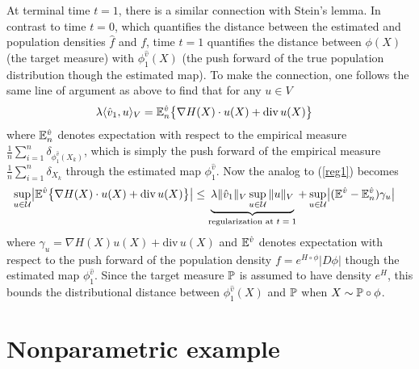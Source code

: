 \documentclass[noinfoline]{imsart}
\begin{document}
 At terminal time $t=1$, there is a similar connection with Stein's lemma. In contrast to time $t=0$, which quantifies the distance between the estimated  and population densities $\hat f$ and $f$,  time $t=1$ quantifies the distance between $\phi(X)$ (the target measure) with $\phi_1^{\hat v}(X)$ (the push forward of the true population distribution though the estimated map).  To make the connection, one follows  the same line of argument as above to  find that  for any $u\in V$
\begin{align}
\lambda \langle \hat v_1, u\rangle_V &=  {\Bbb E}^{\hat v}_n\bigl\{ \nabla H(X)\cdot u(X ) + \text{div}\, u(X)\bigr\} \label{stein}
\end{align}
where ${\Bbb E}^{\hat v}_n$ denotes  expectation with respect to the empirical measure $\frac{1}{n}\sum_{i=1}^n \delta_{\phi^{\hat v}_1(X_k)}$, which is simply the push forward of the empirical measure $\frac{1}{n}\sum_{i=1}^n \delta_{X_k}$ through the estimated map $\phi^{\hat v}_1$.
Now the analog to (\ref{reg1})  becomes
   \begin{align}
   \label{reg2}
    \sup_{u\in \mathcal U} \bigl| {\Bbb E^{\hat v}}\bigl\{ \nabla H(X)\cdot  u(X) + \text{div}\, u(X)\bigr\} \bigr|   &\leq \underbrace{ \lambda \| \hat v_1\|_V  \sup_{u\in \mathcal U} \|  u \|_V }_\text{regularization at $t=1$} +\, {\sup_{u\in \mathcal U} \bigl| (\Bbb E^{\hat v} -\Bbb E_n^{\hat v}) \gamma_{u}\bigr|}
 \end{align}
 where $\gamma_{u} = \nabla H(X) u(X) + \text{div}\, u(X)$ and $\Bbb E^{\hat v}$ denotes expectation with respect to the push forward of the population density $f =    e^{ H\circ \phi} |D\phi| $ though the estimated map $\phi_1^{\hat v}$.
Since the target measure $\Bbb P$ is assumed to have density $e^H$, this bounds the distributional distance between $\phi^{\hat v}_1(X)$ and $\Bbb P$ when $X\sim \Bbb P\circ \phi$.



\section{Nonparametric example}
\label{npe}
\end{document}
